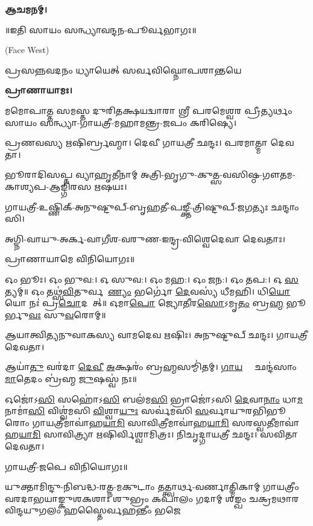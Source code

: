 \textbf{𑌆𑌚𑌮𑌨𑌮𑍍।}


\centerline{॥𑌇𑌤𑌿 𑌸𑌾𑌯𑌂 𑌸𑌨𑍍𑌧𑍍𑌯𑌾𑌵𑌨𑍍𑌦𑌨-𑌪𑍂𑌰𑍍𑌵𑌭𑌾𑌗𑌃॥}



{\scriptsize (Face West)}

{𑌪𑍍𑌰𑌸𑌨𑍍𑌨𑌵𑌦𑌨𑌂 𑌧𑍍𑌯𑌾𑌯𑍇𑌤𑍍 𑌸𑌰𑍍𑌵𑌵𑌿𑌘𑍍𑌨𑍋𑌪𑌶𑌾𑌨𑍍𑌤𑌯𑍇}

\textbf{𑌪𑍍𑌰𑌾𑌣𑌾𑌯𑌾𑌮𑌃।}

𑌮𑌮𑍋𑌪𑌾𑌤𑍍𑌤 𑌸𑌮𑌸𑍍𑌤 𑌦𑍁𑌰𑌿𑌤𑌕𑍍𑌷𑌯𑌦𑍍𑌵𑌾𑌰𑌾 𑌶𑍍𑌰𑍀 𑌪𑌰𑌮𑍇𑌶𑍍𑌵𑌰 𑌪𑍍𑌰𑍀𑌤𑍍𑌯𑌰𑍍𑌥𑌂 𑌸𑌾𑌯𑌂 𑌸𑌨𑍍𑌧𑍍𑌯𑌾-𑌗𑌾𑌯𑌤𑍍𑌰𑍀-𑌮𑌹𑌾𑌮𑌨𑍍𑌤𑍍𑌰-𑌜𑌪𑌂 𑌕𑌰𑌿𑌷𑍍𑌯𑍇।


𑌪𑍍𑌰𑌣𑌵𑌸𑍍𑌯 𑌋𑌷𑌿𑌰𑍍𑌬𑍍𑌰𑌹𑍍𑌮𑌾।
𑌦𑍇𑌵𑍀 𑌗𑌾𑌯𑌤𑍍𑌰𑍀 𑌛𑌨𑍍𑌦𑌃।
𑌪𑌰𑌮𑌾𑌤𑍍𑌮𑌾 𑌦𑍇𑌵𑌤𑌾।

𑌭𑍂𑌰𑌾𑌦𑌿𑌸𑌪𑍍𑌤 𑌵𑍍𑌯𑌾𑌹𑍃𑌤𑍀𑌨𑌾𑌮𑍍 𑌅𑌤𑍍𑌰𑌿-𑌭𑍃𑌗𑍁-𑌕𑍁𑌤𑍍𑌸-𑌵𑌸𑌿𑌷𑍍𑌠-𑌗𑍗𑌤𑌮-𑌕𑌾𑌶𑍍𑌯𑌪-𑌆𑌙𑍍𑌗𑌿𑌰𑌸 𑌋𑌷𑌯𑌃।

𑌗𑌾𑌯𑌤𑍍𑌰𑍀-𑌉𑌷𑍍𑌣𑌿𑌕𑍍-𑌅𑌨𑍁𑌷𑍍𑌟𑍁𑌪𑍍-𑌬𑍃𑌹𑌤𑍀-𑌪𑌙𑍍𑌕𑍍𑌤𑍀-𑌤𑍍𑌰𑌿𑌷𑍍𑌟𑍁𑌪𑍍-𑌜𑌗𑌤𑍍𑌯𑌃 𑌛𑌨𑍍𑌦𑌾𑌂𑌸𑌿।

𑌅𑌗𑍍𑌨𑌿-𑌵𑌾𑌯𑍁-𑌅𑌰𑍍𑌕-𑌵𑌾𑌗𑍀𑌶-𑌵𑌰𑍁𑌣-𑌇𑌨𑍍𑌦𑍍𑌰-𑌵𑌿𑌶𑍍𑌵𑍇𑌦𑍇𑌵𑌾 𑌦𑍇𑌵𑌤𑌾𑌃।
      
𑌪𑍍𑌰𑌾𑌣𑌾𑌯𑌾𑌮𑍇 𑌵𑌿𑌨𑌿𑌯𑍋𑌗𑌃॥


𑌓𑌂 𑌭𑍂𑌃। 𑌓𑌂 𑌭𑍁𑌵:। 𑌓 𑌸𑍁𑌵:। 𑌓𑌂 𑌮𑌹:। 𑌓𑌂 𑌜𑌨:। 𑌓𑌂 𑌤𑌪:। 𑌓 \ul{𑌸}𑌤𑍍𑌯𑌮𑍍॥
𑌓𑌂 𑌤𑌥𑍍𑌸॑\ul{𑌵𑌿}𑌤𑍁𑌰𑍍𑌵𑌰𑍇᳚\ul{𑌣𑍍𑌯𑌂} 𑌭𑌰𑍍𑌗𑍋॑ \ul{𑌦𑍇}𑌵𑌸𑍍𑌯॑ 𑌧𑍀𑌮𑌹𑌿। 𑌧𑌿\ul{𑌯𑍋} 𑌯𑍋 𑌨𑌃॑ 𑌪𑍍𑌰\ul{𑌚𑍋}𑌦𑌯𑌾᳚𑌤𑍍॥
𑌓𑌮𑌾\ul{𑌪𑍋} 𑌜𑍍𑌯𑍋\ul{𑌤𑍀}𑌰\ul{𑌸𑍋}𑌽𑌮𑍃\ul{𑌤𑌂} 𑌬𑍍𑌰\ul{𑌹𑍍𑌮} 𑌭𑍂𑌰𑍍𑌭𑍁\ul{𑌵𑌃} 𑌸𑍁\ul{𑌵}𑌰𑍋𑌮𑍍॥




𑌆𑌯𑌾𑌤𑍍𑌵𑌿𑌤𑍍𑌯𑌨𑍁𑌵𑌾𑌕𑌸𑍍𑌯 𑌵𑌾𑌮𑌦𑍇𑌵 𑌋𑌷𑌿𑌃।
𑌅𑌨𑍁𑌷𑍍𑌟𑍁𑌪𑍍 𑌛𑌨𑍍𑌦𑌃।
𑌗𑌾𑌯𑌤𑍍𑌰𑍀 𑌦𑍇𑌵𑌤𑌾।

𑌆𑌯𑌾॑\ul{𑌤𑍁} 𑌵𑌰॑𑌦𑌾 \ul{𑌦𑍇}\ul{𑌵𑍀} \ul{𑌅}𑌕𑍍𑌷𑌰𑌂॑ 𑌬𑍍𑌰\ul{𑌹𑍍𑌮}𑌸𑌮𑍍𑌮𑌿॑𑌤𑌮𑍍। \ul{𑌗𑌾}\ul{𑌯}𑌤𑍍𑌰𑍀𑌂᳚ 𑌛𑌨𑍍𑌦॑𑌸𑌾𑌂 \ul{𑌮𑌾}𑌤𑍇𑌦𑌂 𑌬𑍍𑌰॑𑌹𑍍𑌮 \ul{𑌜𑍁}𑌷𑌸𑍍𑌵॑ 𑌨𑌃॥

𑌓𑌜𑍋॑𑌽\ul{𑌸𑌿} 𑌸𑌹𑍋॑𑌽\ul{𑌸𑌿} 𑌬𑌲॑𑌮\ul{𑌸𑌿} 𑌭𑍍𑌰𑌾𑌜𑍋॑𑌽𑌸𑌿 \ul{𑌦𑍇}𑌵𑌾\ul{𑌨𑌾𑌂} 𑌧𑌾\ul{𑌮} 𑌨𑌾𑌮𑌾॑\ul{𑌸𑌿} 𑌵𑌿𑌶𑍍𑌵॑𑌮𑌸𑌿 \ul{𑌵𑌿}𑌶𑍍𑌵𑌾\ul{𑌯𑍁𑌃} 𑌸𑌰𑍍𑌵॑𑌮𑌸𑌿 \ul{𑌸}𑌰𑍍𑌵𑌾𑌯𑍁𑌰𑌭𑌿𑌭𑍂𑌰𑍋𑌂 𑌗𑌾𑌯𑌤𑍍𑌰𑍀𑌮𑌾𑌵𑌾॑𑌹\ul{𑌯𑌾}\ul{𑌮𑌿} 𑌸𑌾𑌵𑌿𑌤𑍍𑌰𑍀𑌮𑌾𑌵𑌾॑𑌹\ul{𑌯𑌾}\ul{𑌮𑌿} 𑌸𑌰𑌸𑍍𑌵𑌤𑍀𑌮𑌾𑌵𑌾॑𑌹\-\ul{𑌯𑌾}\ul{𑌮𑌿} 𑌸𑌾𑌵𑌿𑌤𑍍𑌰𑍍𑌯𑌾 𑌋𑌷𑌿𑌰𑍍𑌵𑌿𑌶𑍍𑌵𑌾𑌮𑌿𑌤𑍍𑌰𑌃। 𑌨𑌿𑌚𑍃𑌦𑍍𑌗𑌾𑌯𑌤𑍍𑌰𑍀 𑌛𑌨𑍍𑌦𑌃। 𑌸𑌵𑌿𑌤𑌾 𑌦𑍇𑌵𑌤𑌾।

𑌗𑌾𑌯𑌤𑍍𑌰𑍀-𑌜𑌪𑍇 𑌵𑌿𑌨𑌿𑌯𑍋𑌗𑌃॥



{𑌯𑍁𑌕𑍍𑌤𑌾𑌮𑌿𑌨𑍍𑌦𑍁-𑌨𑌿𑌬𑌦𑍍𑌧-𑌰𑌤𑍍𑌨-𑌮𑌕𑍁𑌟𑌾𑌂 𑌤𑌤𑍍𑌤𑍍𑌵𑌾𑌰𑍍𑌥-𑌵𑌰𑍍𑌣𑌾𑌤𑍍𑌮𑌿𑌕𑌾𑌮𑍍}
{𑌗𑌾𑌯𑌤𑍍𑌰𑍀𑌂 𑌵𑌰𑌦𑌾𑌭𑌯𑌾𑌙𑍍𑌕𑍁𑌶𑌕𑌶𑌾𑌃 𑌶𑍁𑌭𑍍𑌰𑌂 𑌕𑌪𑌾𑌲𑌂 𑌗𑌦𑌾𑌮𑍍}
{𑌶𑌙𑍍𑌖𑌂 𑌚𑌕𑍍𑌰𑌮𑌥𑌾𑌰𑌵𑌿𑌨𑍍𑌦𑌯𑍁𑌗𑌲𑌂 𑌹𑌸𑍍𑌤𑍈𑌰𑍍𑌵𑌹𑌨𑍍𑌤𑍀𑌂 𑌭𑌜𑍇}

